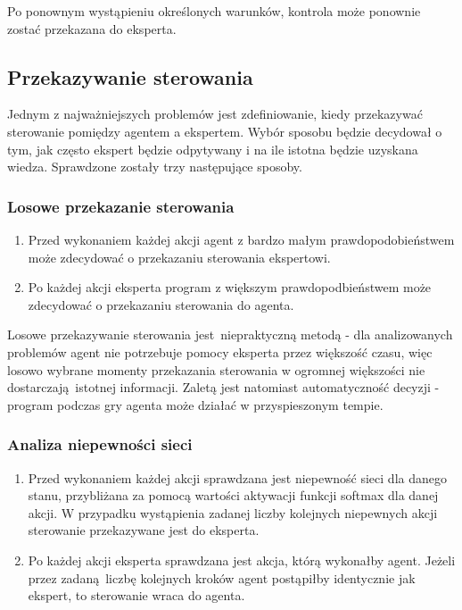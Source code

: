 Po ponownym wystąpieniu określonych warunków, kontrola może ponownie zostać przekazana do eksperta.

\subsection{Przekazywanie sterowania}
Jednym z najważniejszych problemów jest zdefiniowanie, kiedy przekazywać sterowanie pomiędzy agentem a ekspertem. Wybór sposobu będzie decydował o tym, jak często ekspert będzie odpytywany i na ile istotna będzie uzyskana wiedza. Sprawdzone zostały trzy następujące sposoby.

\subsubsection{Losowe przekazanie sterowania}
\begin{enumerate}
\item Przed wykonaniem każdej akcji agent z bardzo małym prawdopodobieństwem może zdecydować o przekazaniu sterowania ekspertowi.
\item Po każdej akcji eksperta program z większym prawdopodbieństwem może zdecydować o przekazaniu sterowania do agenta.
\end{enumerate}

Losowe przekazywanie sterowania jest niepraktyczną metodą - dla analizowanych problemów agent nie potrzebuje pomocy eksperta przez większość czasu, więc losowo wybrane momenty przekazania sterowania w ogromnej większości nie dostarczają istotnej informacji. Zaletą jest natomiast automatyczność decyzji - program podczas gry agenta może działać w przyspieszonym tempie.

\subsubsection{Analiza niepewności sieci}
\begin{enumerate}
\item Przed wykonaniem każdej akcji sprawdzana jest niepewność sieci dla danego stanu, przybliżana za pomocą wartości aktywacji funkcji softmax dla danej akcji. W przypadku wystąpienia zadanej liczby kolejnych niepewnych akcji sterowanie przekazywane jest do eksperta.
\item Po każdej akcji eksperta sprawdzana jest akcja, którą wykonałby agent. Jeżeli przez zadaną liczbę kolejnych kroków agent postąpiłby identycznie jak ekspert, to sterowanie wraca do agenta.
\end{enumerate}

